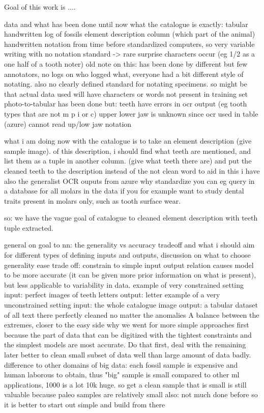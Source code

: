 \documentclass{article}
\begin{document}
Goal of this work is ....

data and what has been done until now
what the catalogue is exactly: tabular handwritten log of fossils
element description column (which part of the animal)
    handwritten notation from time before standardized computers, so very variable writing with no notation standard
        -> rare surprise characters occur (eg 1/2 as a one half of a tooth noter)
            old note on this: has been done by different but few annotators, no logs on who logged what, everyone 
            had a bit different style of notating. also no clearly defined standard 
            for notating specimens. so might be that actual data used will have 
            characters or words not present in training set
photo-to-tabular has been done but:
    teeth have errors in ocr output (eg tooth types that are not m p i or c)
    upper lower jaw is unknown since ocr used in table (azure) cannot read up/low jaw notation

what i am doing now
with the catalogue is to take an element description (give sample image).
of this description, i should find what teeth are mentioned, and list them as a tuple 
in another column. (give what teeth there are) and put the cleaned teeth to 
the description instead of the not clean word
to aid in this i have also the generalist OCR ouputs from azure
why standardize
    you can eg query in a database for all molars in the data 
    if you for example want to study dental traits present in molars only, such as tooth surface wear.

so: we have the vague goal of catalogue to cleaned element description with teeth tuple extracted.

general on goal to nn: the generality vs accuracy tradeoff and what i should aim for
different types of defining inputs and outputs, discussion on what to choose
generality ease trade off: constrain to simple input output relation causes model to be 
more accurate (it can be given more prior information on what is present), but less applicable 
to variability in data.
example of very constrained setting
    input: perfect images of teeth letters
    output: letter
example of a very unconstrained setting
    input: the whole catalogue image
    output: a tabular dataset of all text there perfectly cleaned no matter the anomalies
A balance between the extremes, closer to the easy side
why we went for more simple approaches first
    because the part of data that can be digitized with the tightest constraints and the simplest models are most accurate. Do that first, deal with the remaining later
    better to clean small subset of data well than large amount of data badly.
        difference to other domains of big data:
            each fossil sample is expensive and human laborous to obtain, thus "big" sample is 
            small compared to other ml applications, 1000 is a lot 10k huge. \cite{Faith_Lyman_2019}
            so get a clean sample that is small is still valuable because paleo samples are relatively small
        also: not much done before so it is better to start out simple and build from there
\end{document}
